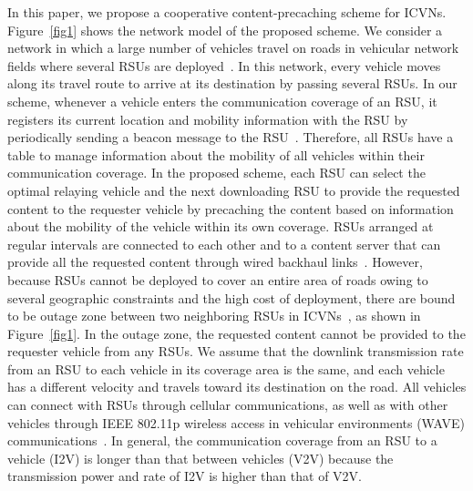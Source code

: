 \documentclass[electronics,aricle,accept,pdftex,moreauthors]{Definitions/mdpi}
\begin{document}
In this paper, we propose a cooperative content-precaching scheme for ICVNs. Figure~\ref{fig1} shows the network model of the proposed scheme. We consider a network in which a large number of vehicles travel on roads in vehicular network fields where several RSUs are deployed~\cite{Wang2016, Reis2014Deploying}. In this network, every vehicle moves along its travel route to arrive at its destination by passing several RSUs. In our scheme, whenever a vehicle enters the communication coverage of an RSU, it registers its current location and mobility information with the RSU by periodically sending a beacon message to the RSU~\cite{Khaleel2012, Choi2018}.
Therefore, all RSUs have a table to manage information about the mobility of all vehicles within their communication coverage. In the proposed scheme, each RSU can select the optimal relaying vehicle and the next downloading RSU to provide the requested content to the requester vehicle by precaching the content based on information about the mobility of the vehicle within its own coverage. RSUs arranged at regular intervals are connected to each other and to a content server that can provide all the requested content through wired backhaul links~\cite{Reis2014Deploying}.
However, because RSUs cannot be deployed to cover an entire area of roads owing to several geographic constraints and the high cost of deployment, there are bound to be outage zone between two neighboring RSUs in ICVNs~\cite{ParidelKoosha2012VAdt}, as shown in Figure~\ref{fig1}. In the outage zone, the requested content cannot be provided to the requester vehicle from any RSUs. We assume that the downlink transmission rate from an RSU to each vehicle in its coverage area is the same, and each vehicle has a different velocity and travels toward its destination on the road. All vehicles can connect with RSUs through cellular communications, as well as with other vehicles through IEEE 802.11p wireless access in vehicular environments (WAVE) communications~\cite{wave2016, Arena2020}.
In general, the communication coverage from an RSU to a vehicle (I2V) is longer than that between vehicles (V2V) because the transmission power and rate of I2V is higher than that of V2V.
\end{document}
